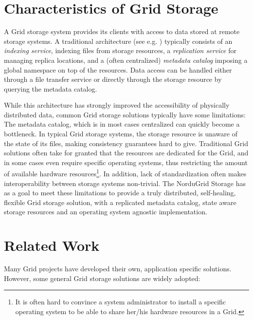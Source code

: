 \documentclass{llncs}
\begin{document}
\section{Characteristics of Grid Storage}
\label{Characteristics of Grid Storage}

A Grid storage system provides its clients with access to data
stored at remote storage systems. A traditional architecture (see
e.g. \cite{datagrid,egeeddm}) typically
consists of an {\it indexing service}, indexing files from storage
resources, a {\it replication service} for managing replica locations,
and a (often centralized) {\it metadata catalog} imposing a global
namespace on top of the resources. Data access can be handled either
through a file transfer service or directly through the storage
resource by querying the metadata catalog.

While this architecture has strongly improved the accessibility of
physically distributed data, common Grid storage solutions typically have
some limitations: The metadata catalog, which is in most cases
centralized can quickly become a bottleneck. In typical Grid storage
systems, the storage resource is unaware of the state of its files,
making consistency guarantees hard to give. Traditional Grid
solutions often take for granted that the resources are dedicated for
the Grid, and in some cases even require specific operating systems,
thus restricting the amount of available hardware resources\footnote{It is often hard to convince a
system administrator to install a specific operating system to be able to share
her/his hardware resources in a Grid.}. In addition, lack of
standardization often makes interoperability between storage systems
non-trivial.
The NorduGrid Storage has as a goal to meet these limitations to
provide a truly distributed, self-healing, flexible Grid storage
solution, with a replicated metadata catalog, state aware storage
resources and an operating system agnostic implementation.

\section{Related Work}
\label{Related Work}
Many Grid projects have developed their own, application specific
solutions. However, some general Grid storage solutions are widely
adopted: 
\end{document}

